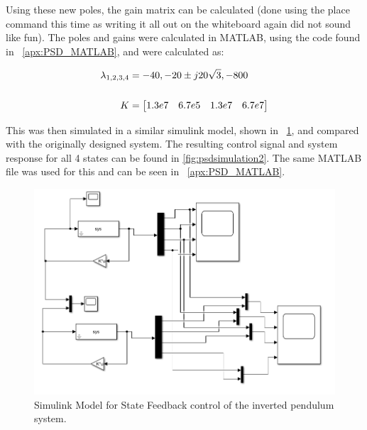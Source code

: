 \documentclass[]{article}
\begin{document}
			Using these new poles, the gain matrix can be calculated (done using the place command this time as writing it all out on the whiteboard again did not sound like fun). The poles and gains were calculated in MATLAB, using the code found in \appendixname \ \ref{apx:PSD_MATLAB}, and were calculated as:
			
			\begin{align}
				\lambda_{1,2,3,4} &= {-40, -20 \pm j 20 \sqrt{3}, -800}\\
				\nonumber\\
				K &= \mqty[1.3e7&6.7e5&1.3e7&6.7e7]
			\end{align}
			
			This was then simulated in a similar simulink model, shown in \figurename \ \ref{fig:psdsimulinkmodel2}, and compared with the originally designed system. The resulting control signal and system response for all 4 states can be found in \figurename \ref{fig:psdsimulation2}. The same MATLAB file was used for this and can be seen in \appendixname \ \ref{apx:PSD_MATLAB}.
			
			\begin{figure}[p]
				\centering
				\includegraphics[width=1\linewidth]{Fig/PSD_SimulinkModel_2}
				\caption{Simulink Model for State Feedback control of the inverted pendulum system.}
				\label{fig:psdsimulinkmodel2}
			\end{figure}
			
\end{document}
